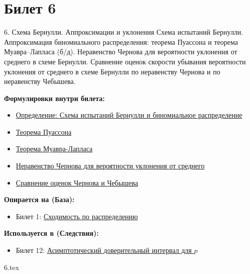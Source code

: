 \documentclass[a4paper, 12pt]{article}
\newcommand{\ticketsection}[1]{\vspace{0.5em}\noindent\textbf{\textcolor{ticketdark}{\sffamily #1}}\par}
\begin{document}
\section{Билет 6}
\begin{ticketskeleton}{6. Схема Бернулли. Аппроксимации и уклонения}
     Схема испытаний Бернулли. Аппроксимация биномиального распределения: теорема Пуассона и теорема Муавра--Лапласа (б/д). Неравенство Чернова для вероятности уклонения от среднего в схеме Бернулли. Сравнение оценок скорости убывания вероятности уклонения от среднего в схеме Бернулли по неравенству Чернова и по неравенству Чебышева.

    \ticketsection{Формулировки внутри билета:}
    \begin{itemize}
        \item \hyperref[def:bernoulli]{Определение: Схема испытаний Бернулли и биномиальное распределение}
        \item \hyperref[cor:poisson]{ Теорема Пуассона}
        \item \hyperref[cor:moivre_laplace]{ Теорема Муавра-Лапласа}
        \item \hyperref[thm:chernoff]{Неравенство Чернова для вероятности уклонения от среднего}
        \item \hyperref[comp:chernoff_cheb]{Сравнение оценок Чернова и Чебышева}
    \end{itemize}

    \ticketsection{Опирается на (База):}
    \begin{itemize}
        \item Билет 1: \hyperref[def:conv_dist]{Сходимость по распределению}
    \end{itemize}

    \ticketsection{Используется в (Следствия):}
    \begin{itemize}
        \item Билет 12: \hyperref[ex:ci_bernoulli]{Асимптотический доверительный интервал для $p$}
    \end{itemize}
\end{ticketskeleton}

{6.tex}
\end{document}
